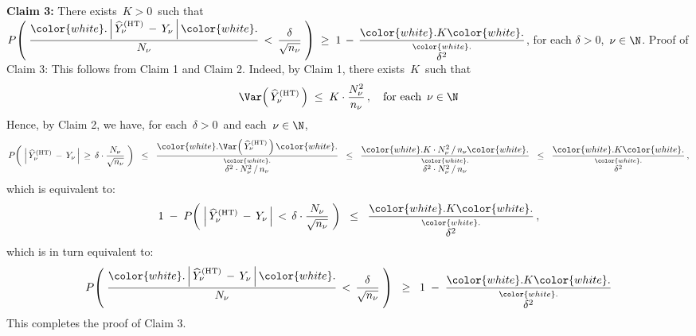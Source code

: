 \vskip 0.5cm
\noindent
\textbf{Claim 3:}\quad
There exists \,$K > 0$\, such that
\;$
P\!\left(\;
    \dfrac{
        {\color{white}.}
        \left\vert\,\widehat{Y}^{\textnormal{(HT)}}_{\nu}\,-\,Y_{\nu}\,\right\vert
        {\color{white}.}
        }{
        N_{\nu}
        }
    \,<\,
    \dfrac{\delta}{\sqrt{n_{\nu}}}
    \;\right)
\; \geq \;
    1
    \,-\,
    \dfrac{
        {\color{white}.}
        K
        {\color{white}.}
        }{
        \overset{{\color{white}.}}{\delta^{2}}
        }
$,\;\;
for each $\delta > 0$,\, $\nu\in\N$.
\vskip 0.2cm
\noindent
Proof of Claim 3:\;\;
This follows from Claim 1 and Claim 2.
Indeed, by Claim 1, there exists \,$K$\, such that
\begin{equation*}
\Var\!\left(\,\widehat{Y}^{\textnormal{(HT)}}_{\nu}\,\right)
\;\leq\;
    K\cdot\dfrac{N_{\nu}^{2}}{n_{\nu}}\,,
\quad
\textnormal{for each \,$\nu \in \N$}
\end{equation*}
Hence, by Claim 2, we have, for each \,$\delta > 0$\, and each \,$\nu \in \N$,\,
\begin{equation*}
P\!\left(\;
    \left\vert\,\widehat{Y}^{\textnormal{(HT)}}_{\nu}\,-\,Y_{\nu}\,\right\vert
    \,\geq\,
    \delta\cdot\dfrac{N_{\nu}}{\sqrt{n_{\nu}}}
    \;\right)
\;\;\leq\;\;
    \dfrac{
        {\color{white}.}
        \Var\!\left(\,\widehat{Y}_{\nu}^{\textnormal{(HT)}}\,\right)
        {\color{white}.}
        }{
        \overset{{\color{white}.}}{\delta^{2} \cdot N_{\nu}^{2}\,\slash\,n_{\nu}}
        }
\;\;\leq\;\;
    \dfrac{
        {\color{white}.}
        K \cdot N_{\nu}^{2} \,\slash\, n_{\nu} 
        {\color{white}.}
        }{
        \overset{{\color{white}.}}{\delta^{2} \cdot N_{\nu}^{2}\,\slash\,n_{\nu}}
        }
\;\;\leq\;\;
    \dfrac{
        {\color{white}.}
        K
        {\color{white}.}
        }{
        \overset{{\color{white}.}}{\delta^{2}}
        }\,,
\end{equation*}
which is equivalent to:
\begin{equation*}
1
\;-\;
P\!\left(\;
    \left\vert\,\widehat{Y}^{\textnormal{(HT)}}_{\nu}\,-\,Y_{\nu}\,\right\vert
    \,<\,
    \delta\cdot\dfrac{N_{\nu}}{\sqrt{n_{\nu}}}
    \;\right)
\;\; \leq \;\;
    \dfrac{
        {\color{white}.}
        K
        {\color{white}.}
        }{
        \overset{{\color{white}.}}{\delta^{2}}
        }\,,
\end{equation*}
which is in turn equivalent to:
\begin{equation*}
P\!\left(\;
    \dfrac{
        {\color{white}.}
        \left\vert\,\widehat{Y}^{\textnormal{(HT)}}_{\nu}\,-\,Y_{\nu}\,\right\vert
        {\color{white}.}
        }{
        N_{\nu}
        }
    \,<\,
    \dfrac{\delta}{\sqrt{n_{\nu}}}
    \;\right)
\;\; \geq \;\;
    1
    \;-\;
    \dfrac{
        {\color{white}.}
        K
        {\color{white}.}
        }{
        \overset{{\color{white}.}}{\delta^{2}}
        }
\end{equation*}
This completes the proof of Claim 3.

